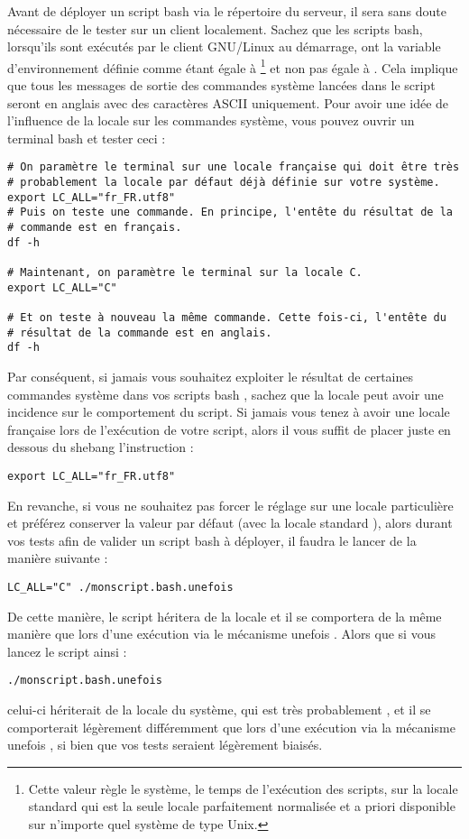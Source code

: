 Avant de déployer un script bash via le répertoire 
du serveur, il sera sans doute
nécessaire de le tester sur un client localement.
Sachez que les scripts bash, lorsqu'ils sont exécutés par le client
GNU/Linux au démarrage, ont la variable d'environnement 
définie comme étant égale à %
\footnote{Cette valeur règle le système, le temps de l'exécution des scripts,
sur la locale standard  qui est la seule locale parfaitement
normalisée et a priori disponible sur n'importe quel système de type Unix.}
et non pas égale
à . Cela implique que tous les messages de sortie
des commandes système lancées dans le script
seront en anglais avec des caractères ASCII uniquement.
Pour avoir une idée de l'influence de la locale sur les commandes système,
vous pouvez ouvrir un terminal bash et tester ceci :
%
\begin{lstlisting}
# On paramètre le terminal sur une locale française qui doit être très
# probablement la locale par défaut déjà définie sur votre système.
export LC_ALL="fr_FR.utf8"
# Puis on teste une commande. En principe, l'entête du résultat de la
# commande est en français.
df -h

# Maintenant, on paramètre le terminal sur la locale C.
export LC_ALL="C"

# Et on teste à nouveau la même commande. Cette fois-ci, l'entête du
# résultat de la commande est en anglais.
df -h
\end{lstlisting}
%
Par conséquent, si jamais vous souhaitez exploiter le résultat de certaines
commandes système dans vos scripts bash , sachez que la
locale peut avoir une incidence sur le comportement du script.
Si jamais vous
tenez à avoir une locale française lors de l'exécution de votre
script, alors il vous suffit de placer juste en dessous du shebang
l'instruction :
%
\begin{lstlisting}
export LC_ALL="fr_FR.utf8"
\end{lstlisting}
%
En revanche, si vous ne souhaitez pas forcer le réglage sur une
locale particulière et préférez conserver la valeur par défaut
(avec la locale standard ), alors durant vos tests afin
de valider un script bash à déployer, il faudra le lancer
de la manière suivante :
%
\begin{lstlisting}
LC_ALL="C" ./monscript.bash.unefois
\end{lstlisting}
%
De cette manière, le script héritera de la locale  et il
se comportera de la même manière que lors d'une exécution via le mécanisme
\og unefois \fg{}. Alors que si vous lancez le script ainsi :
%
\begin{lstlisting}
./monscript.bash.unefois
\end{lstlisting}
%
celui-ci hériterait de la locale du système, qui est très probablement
, et il se comporterait légèrement différemment que
lors d'une exécution via la mécanisme \og unefois \fg{}, si bien que vos 
tests seraient légèrement biaisés.


